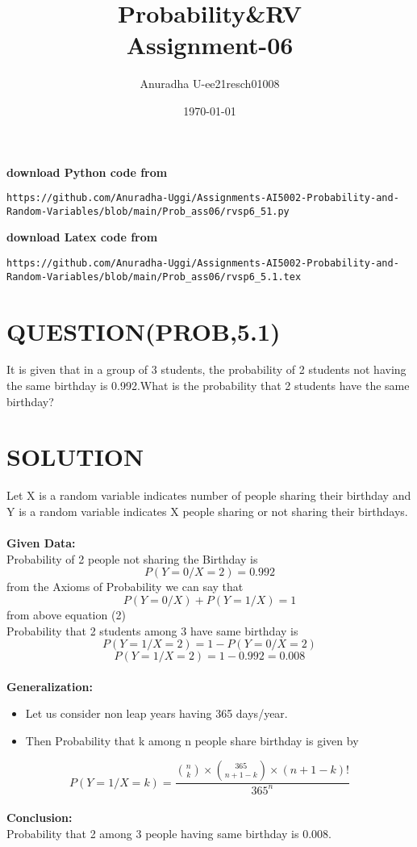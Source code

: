 \documentclass[journal,12pt,twocolumn]{IEEEtran}
\title{Probability\&RV \\ Assignment-06}
\author{Anuradha U-ee21resch01008}
\date{\today}
\begin{document}
\maketitle
\newpage
\bigskip
\renewcommand{\thefigure}{\theenumi}
\renewcommand{\thetable}{\theenumi}
\textbf{download Python code from}
\begin{lstlisting}
https://github.com/Anuradha-Uggi/Assignments-AI5002-Probability-and-Random-Variables/blob/main/Prob_ass06/rvsp6_51.py
\end{lstlisting}
\textbf{download Latex code from}
\begin{lstlisting}
https://github.com/Anuradha-Uggi/Assignments-AI5002-Probability-and-Random-Variables/blob/main/Prob_ass06/rvsp6_5.1.tex
\end{lstlisting}
\section{\textbf{QUESTION(PROB,5.1)}}
It is given that in a group of 3 students, the probability of 2 students not having the same birthday is 0.992.What is the probability that 2 students have the same birthday?

\section{\textbf{SOLUTION}}
Let X is a random variable indicates number of people sharing their birthday and Y is a random variable indicates X people sharing or not sharing their birthdays.\\ \\
\textbf{Given Data:} \\
Probability of 2 people not sharing the Birthday is
\begin{equation}
    P(Y=0/X=2)=0.992
\end{equation}
from the Axioms of Probability we can say that
\begin{equation}
    P(Y=0/X)+P(Y=1/X)=1
\end{equation}
from above equation (2)\\
Probability that 2 students among 3 have same birthday is 
\begin{equation}
    P(Y=1/X=2)=1-P(Y=0/X=2)
\end{equation}
\begin{equation}
    P(Y=1/X=2)=1-0.992=0.008
\end{equation}
\\
\textbf{Generalization:}\\
\begin{itemize}
    \item Let us consider non leap years having 365 days/year. 
    \item Then Probability that k among n people share birthday is given by
\end{itemize}

\begin{equation}
    P(Y=1/X=k)= \frac{\binom{n}{k}\times \binom{365}{n+1-k}\times (n+1-k)!}{365^n}
\end{equation}
\\
\textbf{Conclusion:}\\
Probability that 2 among 3 people having same birthday is 0.008.
\end{document}
